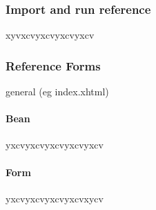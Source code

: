 \subsubsection{Import and run reference}
xyvxcvyxcvyxcvyxcv

\subsubsection{Reference Forms}
\label{subsec:referenceForms}
general (eg index.xhtml)

\paragraph{Bean}
yxcvyxcvyxcvyxcvyxcv

\paragraph{Form}
yxcvyxcvyxcvyxcvxycv




